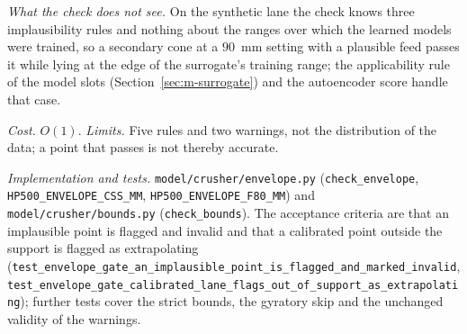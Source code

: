 \emph{What the check does not see.} On the synthetic lane the check knows three implausibility rules and nothing about the ranges over which the
learned models were trained, so a secondary cone at a $90$~mm setting with a plausible feed passes it while lying at the edge of the surrogate's
training range; the applicability rule of the model slots (Section~\ref{sec:m-surrogate}) and the autoencoder score handle that case.

\emph{Cost.} $O(1)$. \emph{Limits.} Five rules and two warnings, not the distribution of the data; a point that passes is not thereby accurate.

\emph{Implementation and tests.} \texttt{model/\allowbreak{}crusher/\allowbreak{}envelope.py} (\texttt{check\_envelope}, \texttt{HP500\_ENVELOPE\_CSS\_MM},
\texttt{HP500\_ENVELOPE\_F80\_MM}) and \texttt{model/\allowbreak{}crusher/\allowbreak{}bounds.py} (\texttt{check\_bounds}). The acceptance criteria are that an implausible
point is flagged and invalid and that a calibrated point outside the support is flagged as extrapolating
(\texttt{test\_envelope\_gate\_an\_implausible\_point\_is\_flagged\_and\_marked\_invalid},
\texttt{test\_envelope\_gate\_calibrated\_lane\_flags\_out\_of\_support\_as\_extrapolating}); further tests cover the strict bounds, the gyratory skip
and the unchanged validity of the warnings.
